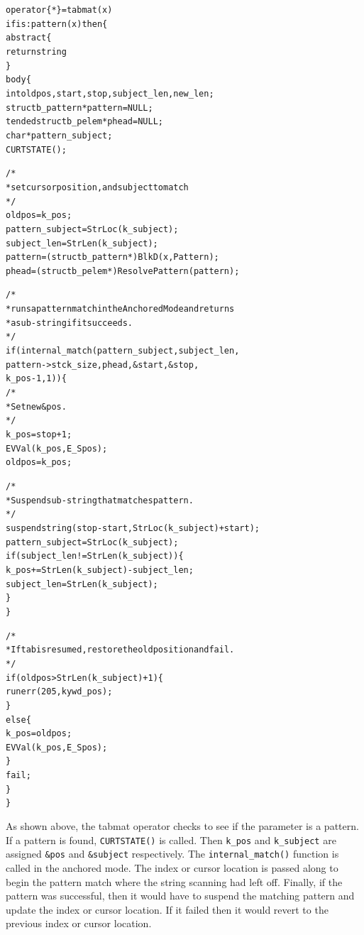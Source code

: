 \documentclass{article}
\begin{document}
\begin{alltt}
operator\{*\} = tabmat(x)
   if is:pattern(x) then \{
      abstract \{
         return string
         \}
      body \{
         int oldpos, start, stop, subject_len, new_len;
         struct b_pattern *pattern = NULL;
         tended struct b_pelem *phead = NULL; 
         char * pattern_subject;
         CURTSTATE();
         
         /*
          * set cursor position, and subject to match
          */
         oldpos = k_pos;
         pattern_subject = StrLoc(k_subject);
         subject_len = StrLen(k_subject);
         pattern = (struct b_pattern *)BlkD(x, Pattern);
         phead = (struct b_pelem *)ResolvePattern(pattern);
         
         /*
          * runs a pattern match in the Anchored Mode and returns
          * a sub-string if it succeeds.
          */
         if (internal_match(pattern_subject, subject_len, 
               pattern->stck_size, phead, &start, &stop, 
               k_pos - 1, 1))\{
            /*
             * Set new &pos.
             */ 
            k_pos = stop + 1;
            EVVal(k_pos, E_Spos);	
            oldpos = k_pos;
         
            /*
             * Suspend sub-string that matches pattern.
             */
            suspend string(stop - start, StrLoc(k_subject)+ start);
            pattern_subject = StrLoc(k_subject);
            if (subject_len != StrLen(k_subject)) \{
               k_pos += StrLen(k_subject) - subject_len;
               subject_len = StrLen(k_subject);
               \}
            \}
            
         /*
          * If tab is resumed, restore the old position and fail.
          */
         if (oldpos > StrLen(k_subject) + 1)\{
            runerr(205, kywd_pos);
            \} 
         else \{
            k_pos = oldpos;
            EVVal(k_pos, E_Spos);
            \}
         fail;
         \}
      \}
\end{alltt}

As shown above, the tabmat operator checks to see if the parameter is a pattern.  If a pattern is found, \texttt{CURTSTATE()} is called.  Then \texttt{k\_pos} and \texttt{k\_subject} are assigned \texttt{\&pos} and \texttt{\&subject} respectively.  The \texttt{internal\_match()} function is called in the anchored mode.  The index or cursor location is passed along to begin the pattern match where the string scanning had left off.  Finally, if the pattern was successful, then it would have to suspend the matching pattern and update the index or cursor location.  If it failed then it would revert to the previous index or cursor location.  
\end{document}
